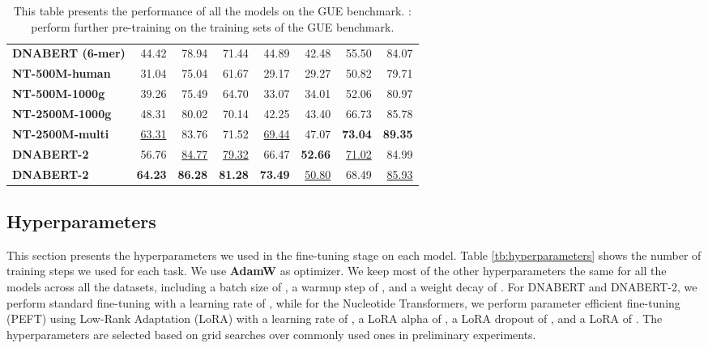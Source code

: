 \documentclass{article}
\begin{document}
\begin{table}[H]
\begin{tabular}{lrrrrrrr}
            {\textbf{DNABERT (6-mer) } } &  44.42 & 78.94 & 71.44 & 44.89 & 42.48 &55.50 & 84.07 \\

            {\textbf{NT-500M-human} } &  31.04 & 75.04 & 61.67 & 29.17 & 29.27 &  50.82 & 79.71 \\

            {\textbf{NT-500M-1000g} } & 39.26 & 75.49 & 64.70 & 33.07 & 34.01 &  52.06 & 80.97 \\

            {\textbf{NT-2500M-1000g} } & 48.31 & 80.02 & 70.14 & 42.25 & 43.40 &  66.73 & 85.78  \\

            {\textbf{NT-2500M-multi} } & \underline{63.31} & 83.76 & 71.52 & \underline{69.44} & 47.07 &  \textbf{73.04} & \textbf{89.35} \\

		
		\midrule

            {\textbf{DNABERT-2} } & 56.76 & \underline{84.77} & \underline{79.32} & 66.47 & \textbf{52.66} & \underline{71.02} & 84.99 \\

            {\textbf{DNABERT-2} } &  \textbf{64.23} & \textbf{86.28} & \textbf{81.28} & \textbf{73.49} & \underline{50.80} & 68.49 & \underline{85.93}\\
		\bottomrule
	\end{tabular}
 
	\caption{
		This table presents the performance of all the models on the GUE benchmark.  : perform further pre-training on the training sets of the GUE benchmark.
	}\label{tb:all_results}
\end{table}








		


 

\subsection{Hyperparameters}
\label{subsec:hyperparameters}

This section presents the hyperparameters we used in the fine-tuning stage on each model. Table \ref{tb:hyperparameters} shows the number of training steps we used for each task. We use \textbf{AdamW} \citep{adamw} as optimizer. We keep most of the other hyperparameters the same for all the models across all the datasets, including a batch size of , a warmup step of , and a weight decay of . For DNABERT and DNABERT-2, we perform standard fine-tuning with a learning rate of , while for the Nucleotide Transformers, we perform parameter efficient fine-tuning (PEFT) using Low-Rank Adaptation (LoRA) with a learning rate of , a LoRA alpha of , a LoRA dropout of , and a LoRA  of . The hyperparameters are selected based on grid searches over commonly used ones in preliminary experiments.
\end{document}
